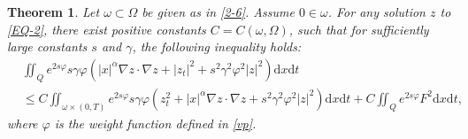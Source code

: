 \documentclass[10pt,a4paper]{amsart}
\newtheorem{theorem}{Theorem}
\def\Om{\Omega}
\def\al{\alpha}
\def\df{\mathrm d}
\def\ga{\gamma}
\def\om{\omega}
\def\ts{\times}
\def\vp{\varphi}
\begin{document}
		\begin{theorem}\label{Carleman2}
			Let $\om\subset\Om$ be given as in \eqref{2-6}. Assume  $0\in\om$. For any solution $z$ to \eqref{EQ-2}, there exist positive constants  $C=C(\om,\Om)$, such that for sufficiently large constants
			$s$ and $\gamma$, the following inequality holds:
			\begin{equation}\label{2.3}
				\begin{split}
					&\iint_Qe^{2s\vp}s\ga \vp \left(|x|^\al \nabla z\cdot \nabla z+|z_t|^2+s^2\ga^2\vp^2|z|^2\right)\df x\df t\\
					&\leq C\iint_{\om\ts (0,T)}e^{2s\vp}s\ga \vp\left( z_t^2+|x|^\al \nabla z\cdot \nabla z +s^2\ga^2\vp^2|z|^2 \right)\df x\df t+C\iint_Qe^{2s\vp} F^2\df x\df t,
				\end{split}
			\end{equation}
	where     $\varphi$  is the weight function defined in \eqref{vp}.
		\end{theorem}
\end{document}

